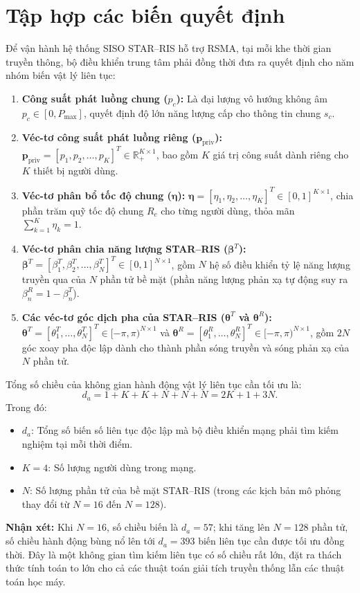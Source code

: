 \section{Tập hợp các biến quyết định}
\label{sec:bien-quyet-dinh}

Để vận hành hệ thống SISO STAR--RIS hỗ trợ RSMA, tại mỗi khe thời gian truyền thông, bộ điều khiển trung tâm
phải đồng thời đưa ra quyết định cho năm nhóm biến vật lý liên tục:
\begin{enumerate}
\item \textbf{Công suất phát luồng chung ($p_c$):} Là đại lượng vô hướng không âm $p_c \in [0, P_{\max}]$,
  quyết định độ lớn năng lượng cấp cho thông tin chung $s_c$.
\item \textbf{Véc-tơ công suất phát luồng riêng ($\mathbf{p}_{\mathrm{priv}}$):}
  $\mathbf{p}_{\mathrm{priv}} = [p_1, p_2, \dots, p_K]^T \in \mathbb{R}_+^{K \times 1}$, bao gồm $K$ giá trị
  công suất dành riêng cho $K$ thiết bị người dùng.
\item \textbf{Véc-tơ phân bổ tốc độ chung ($\boldsymbol{\eta}$):} $\boldsymbol{\eta} = [\eta_1, \eta_2, \dots,
  \eta_K]^T \in [0, 1]^{K \times 1}$, chia phần trăm quỹ tốc độ chung $R_c$ cho từng người dùng, thỏa mãn
  $\sum_{k=1}^{K} \eta_k = 1$.
\item \textbf{Véc-tơ phân chia năng lượng STAR--RIS ($\boldsymbol{\beta}^T$):} $\boldsymbol{\beta}^T =
  [\beta^T_1, \beta^T_2, \dots, \beta^T_N]^T \in [0, 1]^{N \times 1}$, gồm $N$ hệ số điều khiển tỷ lệ năng
  lượng truyền qua của $N$ phần tử bề mặt (phần năng lượng phản xạ tự động suy ra $\beta^R_n = 1 - \beta^T_n$).
\item \textbf{Các véc-tơ góc dịch pha của STAR--RIS ($\boldsymbol{\theta}^T$ và $\boldsymbol{\theta}^R$):}
  $\boldsymbol{\theta}^T = [\theta^T_1, \dots, \theta^T_N]^T \in [-\pi, \pi)^{N \times 1}$ và
  $\boldsymbol{\theta}^R = [\theta^R_1, \dots, \theta^R_N]^T \in [-\pi, \pi)^{N \times 1}$, gồm $2N$ góc xoay
  pha độc lập dành cho thành phần sóng truyền và sóng phản xạ của $N$ phần tử.
\end{enumerate}
Tổng số chiều của không gian hành động vật lý liên tục cần tối ưu là:
\begin{equation}
d_a = 1 + K + K + N + N + N = 2K + 1 + 3N .
\label{eq:so-chieu-hanh-dong}
\end{equation}
Trong đó:
\begin{itemize}
\item $d_a$: Tổng số biến số liên tục độc lập mà bộ điều khiển mạng phải tìm kiếm nghiệm tại mỗi thời điểm.
\item $K = 4$: Số lượng người dùng trong mạng.
\item $N$: Số lượng phần tử của bề mặt STAR--RIS (trong các kịch bản mô phỏng thay đổi từ $N = 16$ đến
  $N = 128$).
\end{itemize}
\textbf{Nhận xét:} Khi $N = 16$, số chiều biến là $d_a = 57$; khi tăng lên $N = 128$ phần tử, số chiều hành
động bùng nổ lên tới $d_a = 393$ biến liên tục cần được tối ưu đồng thời. Đây là một không gian tìm kiếm liên
tục có số chiều rất lớn, đặt ra thách thức tính toán to lớn cho cả các thuật toán giải tích truyền thống lẫn
các thuật toán học máy.

